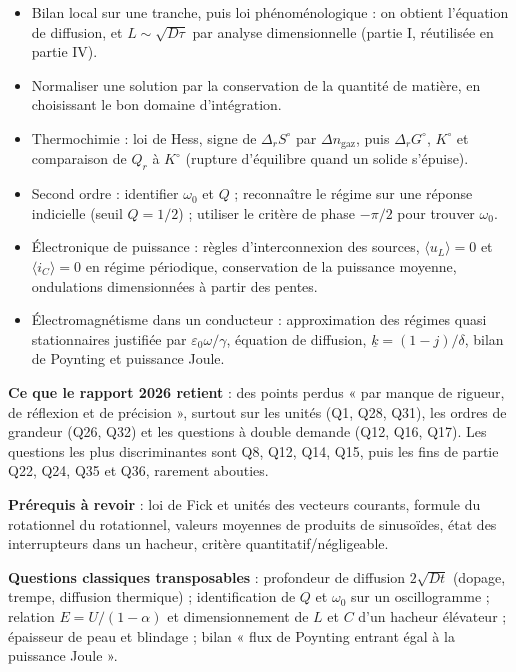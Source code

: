 \documentclass[11pt,a4paper]{article}
\providecommand{\tightlist}{\setlength{\itemsep}{0pt}\setlength{\parskip}{0pt}}
\begin{document}
\begin{itemize}
\tightlist
\item
  Bilan local sur une tranche, puis loi phénoménologique : on obtient l'équation de diffusion, et \(L\sim\sqrt{D\tau}\) par analyse dimensionnelle (partie I, réutilisée en partie IV).
\item
  Normaliser une solution par la conservation de la quantité de matière, en choisissant le bon domaine d'intégration.
\item
  Thermochimie : loi de Hess, signe de \(\Delta_rS^\circ\) par \(\Delta n_{\text{gaz}}\), puis \(\Delta_rG^\circ\), \(K^\circ\) et comparaison de \(Q_r\) à \(K^\circ\) (rupture d'équilibre quand un solide s'épuise).
\item
  Second ordre : identifier \(\omega_0\) et \(Q\) ; reconnaître le régime sur une réponse indicielle (seuil \(Q=1/2\)) ; utiliser le critère de phase \(-\pi/2\) pour trouver \(\omega_0\).
\item
  Électronique de puissance : règles d'interconnexion des sources, \(\langle u_L\rangle=0\) et \(\langle i_C\rangle=0\) en régime périodique, conservation de la puissance moyenne, ondulations dimensionnées à partir des pentes.
\item
  Électromagnétisme dans un conducteur : approximation des régimes quasi stationnaires justifiée par \(\varepsilon_0\omega/\gamma\), équation de diffusion, \(\underline k=(1-j)/\delta\), bilan de Poynting et puissance Joule.
\end{itemize}

\textbf{Ce que le rapport 2026 retient} : des points perdus « par manque de rigueur, de réflexion et de précision », surtout sur les unités (Q1, Q28, Q31), les ordres de grandeur (Q26, Q32) et les questions à double demande (Q12, Q16, Q17). Les questions les plus discriminantes sont Q8, Q12, Q14, Q15, puis les fins de partie Q22, Q24, Q35 et Q36, rarement abouties.

\textbf{Prérequis à revoir} : loi de Fick et unités des vecteurs courants, formule du rotationnel du rotationnel, valeurs moyennes de produits de sinusoïdes, état des interrupteurs dans un hacheur, critère quantitatif/négligeable.

\textbf{Questions classiques transposables} : profondeur de diffusion \(2\sqrt{Dt}\) (dopage, trempe, diffusion thermique) ; identification de \(Q\) et \(\omega_0\) sur un oscillogramme ; relation \(E=U/(1-\alpha)\) et dimensionnement de \(L\) et \(C\) d'un hacheur élévateur ; épaisseur de peau et blindage ; bilan « flux de Poynting entrant égal à la puissance Joule ».
\end{document}
